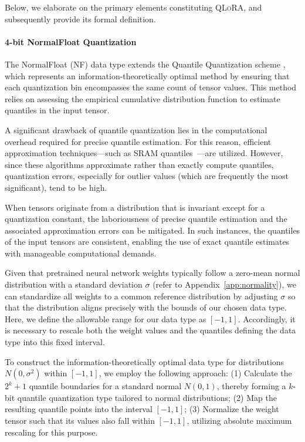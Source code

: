 Below, we elaborate on the primary elements constituting \textsc{QLoRA}, and subsequently provide its formal definition.

\paragraph{4-bit NormalFloat Quantization} The NormalFloat (NF) data type extends the Quantile Quantization scheme \citep{dettmers2022optimizers}, which represents an information-theoretically optimal method by ensuring that each quantization bin encompasses the same count of tensor values. This method relies on assessing the empirical cumulative distribution function to estimate quantiles in the input tensor.

A significant drawback of quantile quantization lies in the computational overhead required for precise quantile estimation. For this reason, efficient approximation techniques—such as SRAM quantiles~\citep{dettmers2022optimizers}—are utilized. However, since these algorithms approximate rather than exactly compute quantiles, quantization errors, especially for outlier values (which are frequently the most significant), tend to be high.

When tensors originate from a distribution that is invariant except for a quantization constant, the laboriousness of precise quantile estimation and the associated approximation errors can be mitigated. In such instances, the quantiles of the input tensors are consistent, enabling the use of exact quantile estimates with manageable computational demands.

Given that pretrained neural network weights typically follow a zero-mean normal distribution with a standard deviation $\sigma$ (refer to Appendix~\ref{app:normality}), we can standardize all weights to a common reference distribution by adjusting $\sigma$ so that the distribution aligns precisely with the bounds of our chosen data type. Here, we define the allowable range for our data type as $[-1, 1]$. Accordingly, it is necessary to rescale both the weight values and the quantiles defining the data type into this fixed interval.

To construct the information-theoretically optimal data type for distributions $N(0, \sigma^2)$ within $[-1, 1]$, we employ the following approach: (1) Calculate the $2^k+1$ quantile boundaries for a standard normal $N(0, 1)$, thereby forming a $k$-bit quantile quantization type tailored to normal distributions; (2) Map the resulting quantile points into the interval $[-1, 1]$; (3) Normalize the weight tensor such that its values also fall within $[-1, 1]$, utilizing absolute maximum rescaling for this purpose.

